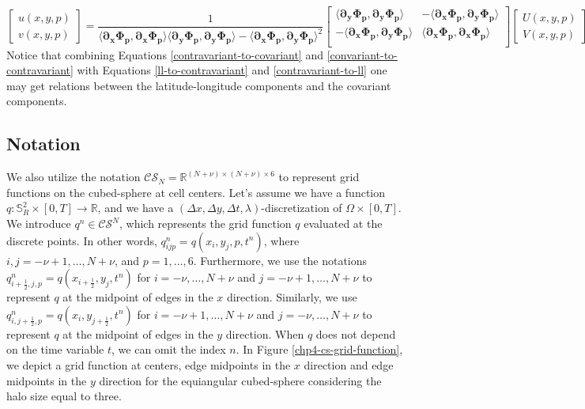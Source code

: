 \begin{equation}
	\label{convariant-to-contravariant}
	\begin{bmatrix}
		{u}(x,y,p) \\
		{v}(x,y,p)
	\end{bmatrix}
	= \frac{1}{\langle \boldsymbol{\partial_x \Phi_p}, \boldsymbol{\partial_x \Phi_p} \rangle
		\langle \boldsymbol{\partial_y \Phi_p}, \boldsymbol{\partial_y \Phi_p} \rangle
		- \langle \boldsymbol{\partial_x \Phi_p}, \boldsymbol{\partial_y \Phi_p} \rangle^2}
	\begin{bmatrix}
		\langle \boldsymbol{\partial_y \Phi_p}, \boldsymbol{\partial_y \Phi_p} \rangle
		& -\langle \boldsymbol{\partial_x \Phi_p}, \boldsymbol{\partial_y \Phi_p} \rangle \\
		-\langle \boldsymbol{\partial_x \Phi_p}, \boldsymbol{\partial_y \Phi_p} \rangle 
		& \langle \boldsymbol{\partial_x \Phi_p}, \boldsymbol{\partial_x \Phi_p} \rangle \\
	\end{bmatrix}
	\begin{bmatrix}
		{U} (x,y,p) \\
		{V} (x,y,p) 
	\end{bmatrix}.
\end{equation}
Notice that combining Equations \eqref{contravariant-to-covariant}
and \eqref{convariant-to-contravariant} with Equations 
\eqref{ll-to-contravariant} and \eqref{contravariant-to-ll}
one may get relations between the latitude-longitude 
components and the covariant components.

\subsection{Notation}
\label{cs-notation}
We also utilize the notation $\mathcal{CS}_N=\mathbb{R}^{(N+\nu)\times(N+\nu)\times 6}$
to represent grid functions on the cubed-sphere at cell centers.
Let's assume we have a function $q:\mathbb{S}^2_R\times[0,T] \to \mathbb{R}$, 
and we have a $(\Delta x, \Delta y, \Delta t, \lambda)$-discretization of $\Omega \times [0,T]$.
We introduce $q^n \in \mathcal{CS}^N$, which represents the grid function $q$
evaluated at the discrete points. 
In other words, $q^n_{ijp} = q(x_i,y_j,p,t^n)$, where $i,j=-\nu +1, \ldots, N+\nu$, and $p=1, \ldots, 6$.
Furthermore, we use the notations $q^n_{i+\frac{1}{2},j,p} = q(x_{i+\frac{1}{2}},y_j, t^n)$ 
for $i=-\nu, \ldots, N+\nu$ and $j=-\nu +1, \ldots, N+\nu$ to represent $q$ at the midpoint of edges in
the $x$ direction.
Similarly, we use $q^n_{i,j+\frac{1}{2},p} = q(x_i,y_{j+\frac{1}{2}},t^n)$ for $i=-\nu +1, \ldots, N+\nu$ and $j=-\nu, \ldots, N+\nu$ to represent $q$ at the midpoint of edges in the $y$ direction.
When $q$ does not depend on the time variable $t$, we can omit the index $n$.
In Figure \ref{chp4-cs-grid-function}, we depict a grid function at centers, edge midpoints in the $x$ direction
and edge midpoints in the $y$ direction for the equiangular cubed-sphere considering
the halo size equal to three.

